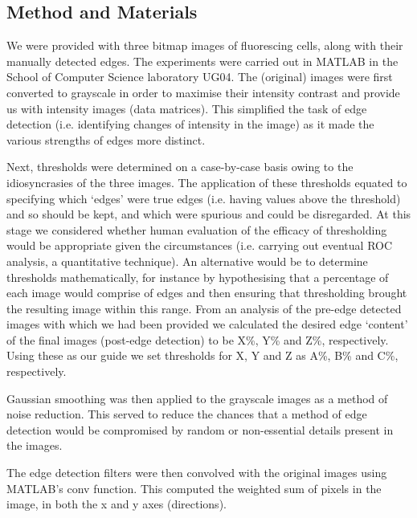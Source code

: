 \documentclass[a4paper]{article}
\begin{document}
\begin{multicols*}{2}
\section*{Method and Materials}

We were provided with three bitmap images of fluorescing cells, along with their manually detected edges. The experiments were carried out in MATLAB in the School of Computer Science laboratory UG04.
The (original) images were first converted to grayscale in order to maximise their intensity contrast and provide us with intensity images (data matrices). This simplified the task of edge detection (i.e. identifying changes of intensity in the image) as it made the various strengths of edges more distinct.


Next, thresholds were determined on a case-by-case basis owing to the idiosyncrasies of the three images. The application of these thresholds equated to specifying which ‘edges’ were true edges (i.e. having values above the threshold) and so should be kept, and which were spurious and could be disregarded. At this stage we considered whether human evaluation of the efficacy of thresholding would be appropriate given the circumstances (i.e. carrying out eventual ROC analysis, a quantitative technique). An alternative would be to determine thresholds mathematically, for instance by hypothesising that a percentage of each image would comprise of edges and then ensuring that thresholding brought the resulting image within this range. From an analysis of the pre-edge detected images with which we had been provided we calculated the desired edge ‘content’ of the final images (post-edge detection) to be X\%, Y\% and Z\%, respectively. Using these as our guide we set thresholds for X, Y and Z as A\%, B\% and C\%, respectively.

Gaussian smoothing was then applied to the grayscale images as a method of noise reduction. This served to reduce the chances that a method of edge detection would be compromised by random or non-essential details present in the images.

The edge detection filters were then convolved with the original images using MATLAB’s conv function. This computed the weighted sum of pixels in the image, in both the x and y axes (directions).

\end{multicols*}
\end{document}
